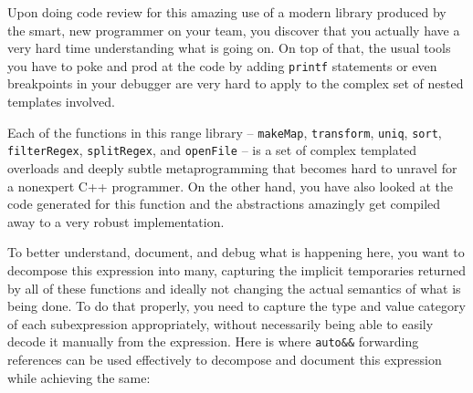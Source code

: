 \noindent Upon doing code review for this amazing use of a modern library produced
by the smart, new programmer on your team, you discover that you actually
have a very hard time understanding what is going on. On top of that,
the usual tools you have to poke and prod at the code by adding
\texttt{printf} statements or even breakpoints in your debugger are very
hard to apply to the complex set of nested templates involved.

Each of the functions in this range library -- \texttt{makeMap},
\texttt{transform}, \texttt{uniq}, \texttt{sort}, \texttt{filterRegex},
\texttt{splitRegex}, and \texttt{openFile} -- is a set of complex
templated overloads and deeply subtle metaprogramming that becomes hard
to unravel for a nonexpert C++ programmer. On the other hand, you have
also looked at the code generated for this function and the abstractions
amazingly get compiled away to a very robust implementation.

To better understand, document, and debug what is happening
here, you want to decompose this expression into many, capturing the
implicit temporaries returned by all of these functions and ideally not
changing the actual semantics of what is being done. To do that
properly, you need to capture the type and value category of each
subexpression appropriately, without necessarily being able to easily
decode it manually from the expression. Here is where \texttt{auto\&\&}
forwarding references can be used effectively to decompose and document
this expression while achieving the same:

